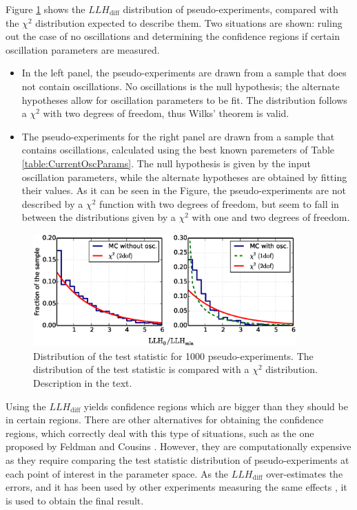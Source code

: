 \documentclass[../Main.tex]{subfiles}
\begin{document}
Figure \ref{fig:llhratio} shows the $LLH_\mathrm{diff}$ distribution of pseudo-experiments, compared with the $\chi^2$ distribution expected to describe them. Two situations are shown: ruling out the case of no oscillations and determining the confidence regions if certain oscillation parameters are measured.
\begin{itemize}
\item In the left panel, the pseudo-experiments are drawn from a sample that does not contain oscillations. No oscillations is the null hypothesis; the alternate hypotheses allow for oscillation parameters to be fit. The distribution follows a $\chi^2$ with two degrees of freedom, thus Wilks' theorem is valid. 

\item The pseudo-experiments for the right panel are drawn from a sample that contains oscillations, calculated using the best known paremeters of Table \ref{table:CurrentOscParams}. The null hypothesis is given by the input oscillation parameters, while the alternate hypotheses are obtained by fitting their values. As it can be seen in the Figure, the pseudo-experiments are not described by a $\chi^2$ function with two degrees of freedom, but seem to fall in between the distributions given by a $\chi^2$ with one and two degrees of freedom.
\end{itemize}

\begin{figure}[h]
 \centering
 \includegraphics[width=0.9\textwidth]{chi2_distribution}
 \caption[Distribution of the test statistic.]{Distribution of the test statistic for 1000 pseudo-experiments. The distribution of the test statistic is compared with a $\chi^2$ distribution. Description in the text.}
 \label{fig:llhratio}
\end{figure}

Using the $LLH_\mathrm{diff}$ yields confidence regions which are bigger than they should be in certain regions. There are other alternatives for obtaining the confidence regions, which correctly deal with this type of situations, such as the one proposed by Feldman and Cousins \cite{feldmancousins}. However, they are computationally expensive as they require comparing the test statistic distribution of pseudo-experiments at each point of interest in the parameter space. As the $LLH_\mathrm{diff}$ over-estimates the errors, and it has been used by other experiments measuring the same effects \cite{minos1, t2k_disappearance}, it is used to obtain the final result.
\end{document}
